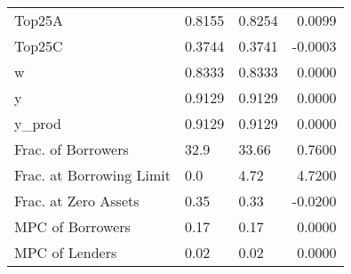 \begin{table}
\begin{tabular}{lllr}
                  Top25A &  0.8155 &   0.8254 &  0.0099 \\
                  Top25C &  0.3744 &   0.3741 & -0.0003 \\
                       w &  0.8333 &   0.8333 &  0.0000 \\
                       y &  0.9129 &   0.9129 &  0.0000 \\
                  y\_prod &  0.9129 &   0.9129 &  0.0000 \\
      Frac. of Borrowers &    32.9 &    33.66 &  0.7600 \\
Frac. at Borrowing Limit &     0.0 &     4.72 &  4.7200 \\
    Frac. at Zero Assets &    0.35 &     0.33 & -0.0200 \\
        MPC of Borrowers &    0.17 &     0.17 &  0.0000 \\
          MPC of Lenders &    0.02 &     0.02 &  0.0000 \\
\bottomrule
\end{tabular}
\end{table}
